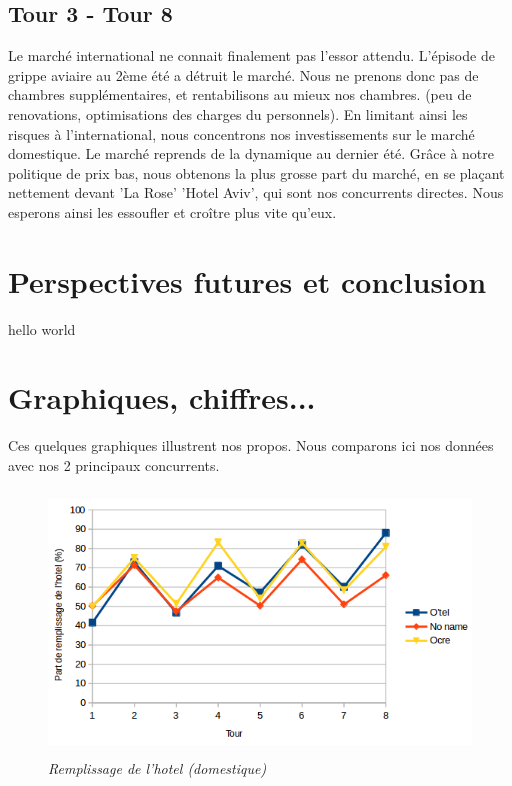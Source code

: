 \documentclass[a4paper,10pt]{article}
\begin{document}
    \subsection{Tour 3 - Tour 8}
      Le marché international ne connait finalement pas l'essor attendu. L'épisode de grippe aviaire au 2ème été a détruit le marché.
      Nous ne prenons donc pas de chambres supplémentaires, et rentabilisons au mieux nos chambres. (peu de renovations, optimisations des charges du personnels).
      \newline
      En limitant ainsi les risques à l'international, nous concentrons nos investissements sur le marché domestique.
      \newline
      \newline
      Le marché reprends de la dynamique au dernier été. Grâce à notre politique de prix bas, nous obtenons la plus grosse part du marché, en se plaçant nettement devant
      'La Rose' 'Hotel Aviv', qui sont nos concurrents directes. Nous esperons ainsi les essoufler et croître plus vite qu'eux.

  \newpage
  \section{Perspectives futures et conclusion}
    hello world
    
  \newpage
  \section{Graphiques, chiffres...}
    Ces quelques graphiques illustrent nos propos. Nous comparons ici nos données avec nos 2 principaux concurrents.
    \newline
        
    \begin{figure}[!ht]
      \begin{center}
	\includegraphics[height=7cm,keepaspectratio]{./images/remplissage_hotel.png}
      \end{center}
      \caption{\textit{Remplissage de l'hotel (domestique)}}
    \end{figure}
    
\end{document}
